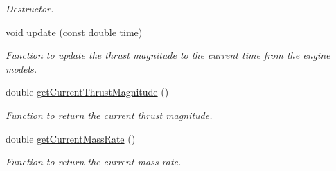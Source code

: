 \begin{DoxyCompactItemize}
\begin{DoxyCompactList}\small\item\em Destructor. \end{DoxyCompactList}\item 
void \hyperlink{classtudat_1_1propulsion_1_1ThrustMagnitudeFromEngineWrapper_a54420ac820119f526d5f33d7d6380fb7}{update} (const double time)
\begin{DoxyCompactList}\small\item\em Function to update the thrust magnitude to the current time from the engine models. \end{DoxyCompactList}\item 
double \hyperlink{classtudat_1_1propulsion_1_1ThrustMagnitudeFromEngineWrapper_afc91cb58c14ddb83956db4c51f0ded54}{get\+Current\+Thrust\+Magnitude} ()
\begin{DoxyCompactList}\small\item\em Function to return the current thrust magnitude. \end{DoxyCompactList}\item 
double \hyperlink{classtudat_1_1propulsion_1_1ThrustMagnitudeFromEngineWrapper_aa79a92ce41bfd5aeacb59bcc675180a0}{get\+Current\+Mass\+Rate} ()
\begin{DoxyCompactList}\small\item\em Function to return the current mass rate. \end{DoxyCompactList}\end{DoxyCompactItemize}

